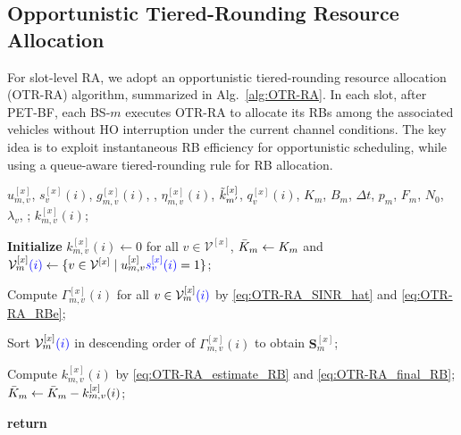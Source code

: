 \documentclass[conference, a4paper]{IEEEtran}
\newcommand{\rev}[1]{\textcolor{revisioncolor}{{}#1}}
\newif\ifshowdeletions
\newcommand{\currentdel}[1]{\ifshowdeletions\textcolor{deletioncolor}{\sout{#1}}\fi}
\theoremstyle{remark}
\begin{document}
\subsection{Opportunistic Tiered-Rounding Resource Allocation}
\label{subsection:OTR-RA strategy}

For slot-level RA, we adopt an opportunistic tiered-rounding resource allocation (OTR-RA) algorithm, summarized in Alg.~\ref{alg:OTR-RA}. In each slot, after PET-BF, each BS-$m$ executes OTR-RA to allocate its RBs among the associated vehicles\rev{ without HO interruption} under the current channel conditions. The key idea is to exploit instantaneous RB efficiency for opportunistic scheduling, while using a queue-aware tiered-rounding rule for RB allocation.

\begin{algorithm}[tbp]
    \caption{Opportunistic Tiered-Rounding Resource Allocation (OTR-RA)}
    \label{alg:OTR-RA}
    \renewcommand{\algorithmicrequire}{\textbf{Input:}}
    \renewcommand{\algorithmicensure}{\textbf{Output:}}
    \begin{algorithmic}[1]
        \REQUIRE
        $u_{m,v}^{[x]}$, \rev{$s_v^{[x]}(i)$, }$g_{m,v}^{[x]}(i)$, \currentdel{$g_{{\rm I},m',v}^{[x]}(i)$}, $\eta_{m,v}^{[x]}(i)$,
        $\Tilde{k}_{m'}^{[x]}$, $q_v^{[x]}(i)$, $K_m$, $B_m$, $\Delta t$,
        $p_m$, $F_m$, $N_0$, $\lambda_v$, \currentdel{$\tau_{\rm th}$};
        \ENSURE
        $k_{m,v}^{[x]}(i)$;

        \STATE \textbf{Initialize} \rev{$k_{m,v}^{[x]}(i)\gets 0$ for all $v\in\mathcal{V}^{[x]}$, }$\Bar{K}_m \gets K_m$ and
               $\mathcal{V}_m^{[x]}\rev{(i)} \gets \{ v \in \mathcal{V}^{[x]} \mid u_{m,v}^{[x]}\rev{s_v^{[x]}(i)} = 1 \}$;

        \STATE Compute $\Gamma_{m,v}^{[x]}(i)$ for all $v \in \mathcal{V}_m^{[x]}\rev{(i)}$ by \eqref{eq:OTR-RA_SINR_hat} and \eqref{eq:OTR-RA_RBe};

        \STATE Sort $\mathcal{V}_m^{[x]}\rev{(i)}$ in descending order of $\Gamma_{m,v}^{[x]}(i)$
               to obtain $\bm{S}_m^{[x]}$;

            \STATE Compute $k_{m,v}^{[x]}(i)$ by \eqref{eq:OTR-RA_estimate_RB} and \eqref{eq:OTR-RA_final_RB};
            \STATE $\Bar{K}_m \gets \Bar{K}_m - k_{m,v}^{[x]}(i)$;
        \ENDFOR

        \STATE \textbf{return}
    \end{algorithmic}
\end{algorithm}
\end{document}
